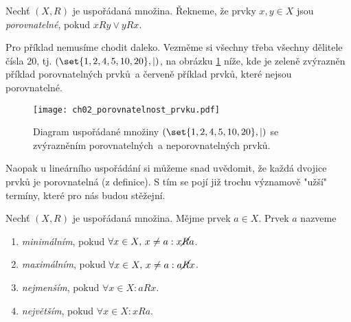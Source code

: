 \begin{definition}\label{def:porovnatelnost}
    Nechť $(X,R)$ je uspořádaná množina. Řekneme, že prvky $x,y\in X$ jsou \emph{porovnatelné}, pokud $xRy \lor yRx$.
\end{definition}
Pro příklad nemusíme chodit daleko. Vezměme si všechny třeba všechny dělitele čísla 20, tj. $(\set{1,2,4,5,10,20},\mid)$, na obrázku \ref{fig:porovnatelnost_prvku} níže, kde je zeleně zvýrazněn příklad porovnatelných prvků~a červeně příklad prvků, které nejsou porovnatelné.
\begin{figure}[H]
    \centering
    \texttt{[image: ch02\_porovnatelnost\_prvku.pdf]}
    \caption{Diagram uspořádané množiny $(\set{1,2,4,5,10,20},\mid)$ se zvýrazněním porovnatelných~a neporovnatelných prvků.}
    \label{fig:porovnatelnost_prvku}
\end{figure}
Naopak u lineárního uspořádání si můžeme snad uvědomit, že každá dvojice prvků je porovnatelná (z definice). S tím se pojí již trochu významově "užší" termíny, které pro nás budou stěžejní.
\begin{definition}
    Nechť $(X,R)$ je uspořádaná množina. Mějme prvek $a\in X$. Prvek $a$ nazveme
    \begin{enumerate}[label=(\roman*)]
        \item \emph{minimálním}, pokud $\forall x\in X,\,x\neq a: x\cancel{R}a$.
        \item \emph{maximálním}, pokud $\forall x\in X,\,x\neq a: a\cancel{R}x$.
        \item \emph{nejmenším}, pokud $\forall x\in X: aRx$.
        \item \emph{největším}, pokud $\forall x\in X: xRa$.
    \end{enumerate}
\end{definition}
